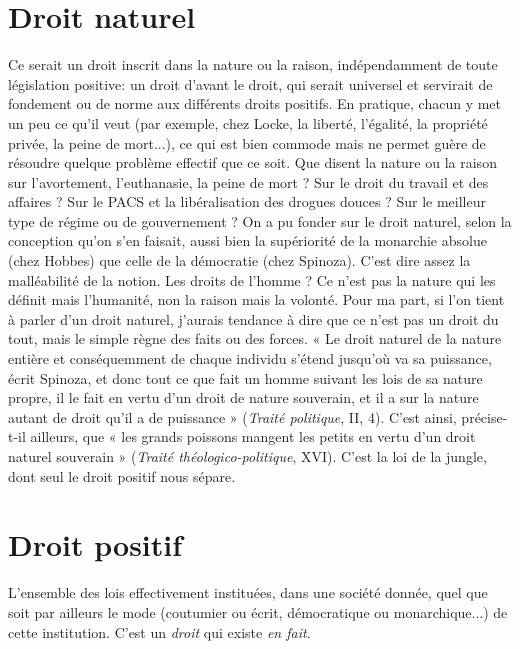 \section{Droit naturel}
Ce serait un droit inscrit dans la nature ou la raison,
indépendamment de toute législation positive: un
droit d’avant le droit, qui serait universel et servirait de fondement ou de
norme aux différents droits positifs. En pratique, chacun y met un peu ce qu’il
veut (par exemple, chez Locke, la liberté, l'égalité, la propriété privée, la peine
de mort...), ce qui est bien commode mais ne permet guère de résoudre
quelque problème effectif que ce soit. Que disent la nature ou la raison sur
l'avortement, l'euthanasie, la peine de mort ? Sur le droit du travail et des
affaires ? Sur le PACS et la libéralisation des drogues douces ? Sur le meilleur
type de régime ou de gouvernement ? On a pu fonder sur le droit naturel, selon
la conception qu’on s’en faisait, aussi bien la supériorité de la monarchie
absolue (chez Hobbes) que celle de la démocratie (chez Spinoza). C’est dire
assez la malléabilité de la notion. Les droits de l’homme ? Ce n’est pas la nature
qui les définit mais l’humanité, non la raison mais la volonté. Pour ma part, si
l’on tient à parler d’un droit naturel, j'aurais tendance à dire que ce n’est pas un
droit du tout, mais le simple règne des faits ou des forces. « Le droit naturel de
la nature entière et conséquemment de chaque individu s’étend jusqu'où va sa
puissance, écrit Spinoza, et donc tout ce que fait un homme suivant les lois de
sa nature propre, il le fait en vertu d’un droit de nature souverain, et il a sur la
nature autant de droit qu’il a de puissance » ({\it Traité politique}, II, 4). C’est ainsi,
précise-t-il ailleurs, que « les grands poissons mangent les petits en vertu d’un
droit naturel souverain » ({\it Traité théologico-politique}, XVI). C’est la loi de la
jungle, dont seul le droit positif nous sépare.

\section{Droit positif}
L'ensemble des lois effectivement instituées, dans une
société donnée, quel que soit par ailleurs le mode (coutumier
ou écrit, démocratique ou monarchique...) de cette institution. C’est un
{\it droit} qui existe {\it en fait}.

